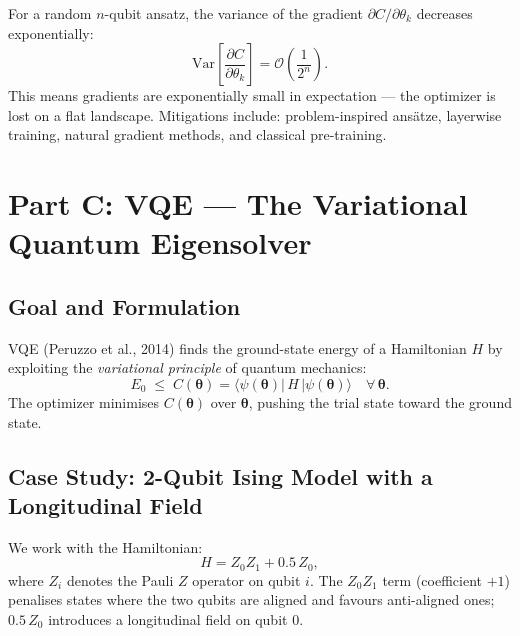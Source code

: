 \documentclass[a4paper,11pt]{article}
\renewcommand{\ket}[1]{|#1\rangle}
\renewcommand{\bra}[1]{\langle#1|}
\begin{document}
\begin{warningbox}
For a random $n$-qubit ansatz, the variance of the gradient
$\partial C/\partial\theta_k$ decreases exponentially:
\[
    \mathrm{Var}\!\left[\frac{\partial C}{\partial\theta_k}\right]
    = \mathcal{O}\!\left(\frac{1}{2^n}\right).
\]
This means gradients are exponentially small in expectation — the optimizer
is lost on a flat landscape. Mitigations include: problem-inspired ansätze,
layerwise training, natural gradient methods, and classical pre-training.
\end{warningbox}

\section{Part C: VQE — The Variational Quantum Eigensolver}

\subsection{Goal and Formulation}

VQE (Peruzzo et al., 2014) finds the ground-state energy of a Hamiltonian $H$
by exploiting the \emph{variational principle} of quantum mechanics:
\begin{equation}
    E_0 \;\leq\; C(\boldsymbol\theta)
    = \bra{\psi(\boldsymbol\theta)}\,H\,\ket{\psi(\boldsymbol\theta)}
    \quad \forall\,\boldsymbol\theta.
\end{equation}
The optimizer minimises $C(\boldsymbol\theta)$ over $\boldsymbol\theta$,
pushing the trial state toward the ground state.

\subsection{Case Study: 2-Qubit Ising Model with a Longitudinal Field}

We work with the Hamiltonian:
\begin{equation}
    \label{eq:ising}
    H = Z_0 Z_1 + 0.5\, Z_0,
\end{equation}
where $Z_i$ denotes the Pauli $Z$ operator on qubit $i$.
The $Z_0 Z_1$ term (coefficient $+1$) penalises states where the two qubits are
aligned and favours anti-aligned ones;
$0.5\, Z_0$ introduces a longitudinal field on qubit 0.
\end{document}
